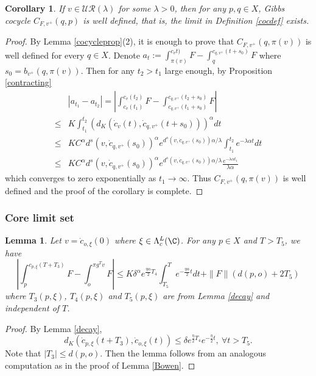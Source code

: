 \documentclass[11pt]{amsart}
\newtheorem{corollary}[theorem]{Corollary}
\newtheorem{lemma}[theorem]{Lemma}
\theoremstyle{definition}
\newcommand{\UR}{\mathcal{UR}}
\def\a{\alpha}
\def\d{\delta}   %
\def\l{\lambda}   \def\L{\Lambda}
\begin{document}
\begin{corollary}\label{cocexi1}
If $v\in \UR(\l)$ for some $\l>0$, then for any $p,q\in X$,  Gibbs cocycle $C_{F,v^+}(q,p)$ is well defined, that is, the limit in Definition \ref{cocdef} exists.
\end{corollary}
\begin{proof}
By Lemma \ref{cocycleprop}(2), it is enough to prove that $C_{F,v^+}(q,\pi(v))$ is well defined for every $q\in X$. Denote $a_t:=\int_{\pi(v)}^{c_vt)}F-\int_{q}^{c_{q,v^+}(t+s_0)}F$ where $s_0=b_{v^+}(q,\pi(v))$. Then for any $t_2>t_1$ large enough, by Proposition \ref{contracting}
\begin{equation*}
\begin{aligned}
&|a_{t_1}-a_{t_2}|=\left|\int_{c_{v}(t_1)}^{c_{v}(t_2)}F-\int_{c_{q,v^+}(t_1+s_0)}^{c_{q,v^+}(t_2+s_0)}F\right|\\
\le &K\int_{t_1}^{t_2}(d_K(\dot c_{v}(t), \dot c_{q,v^+}(t+s_0)))^\a dt\\
\le &KC^\a d^s(v,\dot c_{q,v^+}(s_0))^\a e^{d^s(v,\dot c_{q,v^+}(s_0))\a/\lambda}\int_{t_1}^{t_2} e^{-\lambda\a t}dt\\
\le & KC^\a d^s(v,\dot c_{q,v^+}(s_0))^\a e^{d^s(v,\dot c_{q,v^+}(s_0))\a/\lambda}\frac{e^{-\lambda\a t_1}}{\l\a}
\end{aligned}
\end{equation*}
which converges to zero exponentially as $t_1\to \infty$. Thus $C_{F,v^+}(q,\pi(v))$ is well defined and the proof of the corollary is complete. 
\end{proof}



\subsubsection{Core limit set}
\begin{lemma}\label{Bowen1}
Let $v=\dot{c}_{o,\xi}(0)$ where $\xi\in \L_c^L(\C)$. For any $p\in X$ and $T>T_5$, we have
$$\left|\int_p^{c_{p,\xi}(T+T_3)}F-\int_{o}^{\pi g^Tv}F\right|\le K\d^\a e^{\frac{\eta\a}{2}T_4}\int_{T_5}^{T}e^{-\frac{\eta\a}{2}t}dt+\|F\|(d(p,o)+2T_5)$$
where $T_3(p,\xi)$, $T_4(p,\xi)$ and $T_5(p,\xi)$ are from Lemma \ref{decay} and independent of $T$.
\end{lemma}
\begin{proof}
By Lemma \ref{decay}, 
$$d_K(\dot c_{p,\xi}(t+T_3), \dot c_{o,\xi}(t))\le \d e^{\frac{\eta}{2}T_4}e^{-\frac{\eta}{2}t}, \ \forall t>T_5.$$
Note that $|T_3|\le d(p,o)$. Then the lemma follows from an analogous computation as in the proof of Lemma \ref{Bowen}.
\end{proof}
\end{document}
